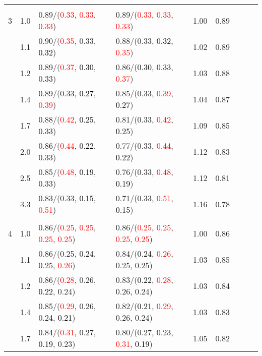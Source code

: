 \documentclass[10pt,a4paper]{report}
\begin{document}
\begin{table}[!htbp]
\begin{center}
{\begin{tabular}{ccllccccc}
			&&&&\\
			3			&1.0&0.89/(\textcolor{red}{0.33}, \textcolor{red}{0.33}, \textcolor{red}{0.33})&0.89/(\textcolor{red}{0.33}, \textcolor{red}{0.33}, \textcolor{red}{0.33})&1.00&0.89\\
			&1.1&0.90/(\textcolor{red}{0.35}, 0.33, \textcolor{black}{0.32})&0.88/(0.33, \textcolor{black}{0.32}, \textcolor{red}{0.35})&1.02&0.89\\
			&1.2&0.89/(\textcolor{red}{0.37}, \textcolor{black}{0.30}, 0.33)&0.86/(\textcolor{black}{0.30}, 0.33, \textcolor{red}{0.37})&1.03&0.88\\
			&1.4&0.89/(0.33, \textcolor{black}{0.27}, \textcolor{red}{0.39})&0.85/(0.33, \textcolor{red}{0.39}, \textcolor{black}{0.27})&1.04&0.87\\
			&1.7&0.88/(\textcolor{red}{0.42}, \textcolor{black}{0.25}, 0.33)&0.81/(0.33, \textcolor{red}{0.42}, \textcolor{black}{0.25})&1.09&0.85\\
			&2.0&0.86/(\textcolor{red}{0.44}, \textcolor{black}{0.22}, 0.33)&0.77/(0.33, \textcolor{red}{0.44}, \textcolor{black}{0.22})&1.12&0.83\\
			&2.5&0.85/(\textcolor{red}{0.48}, \textcolor{black}{0.19}, 0.33)&0.76/(0.33, \textcolor{red}{0.48}, \textcolor{black}{0.19})&1.12&0.81\\
			&3.3&0.83/(0.33, \textcolor{black}{0.15}, \textcolor{red}{0.51})&0.71/(0.33, \textcolor{red}{0.51}, \textcolor{black}{0.15})&1.16&0.78\\
			&&&&\\
			4			&1.0&0.86/(\textcolor{red}{0.25}, \textcolor{red}{0.25}, \textcolor{red}{0.25}, \textcolor{red}{0.25})&0.86/(\textcolor{red}{0.25}, \textcolor{red}{0.25}, \textcolor{red}{0.25}, \textcolor{red}{0.25})&1.00&0.86\\
			&1.1&0.86/(0.25, \textcolor{black}{0.24}, 0.25, \textcolor{red}{0.26})&0.84/(\textcolor{black}{0.24}, \textcolor{red}{0.26}, 0.25, 0.25)&1.03&0.85\\
			&1.2&0.86/(\textcolor{red}{0.28}, 0.26, \textcolor{black}{0.22}, 0.24)&0.83/(\textcolor{black}{0.22}, \textcolor{red}{0.28}, 0.26, 0.24)&1.03&0.84\\
			&1.4&0.85/(\textcolor{red}{0.29}, 0.26, 0.24, \textcolor{black}{0.21})&0.82/(\textcolor{black}{0.21}, \textcolor{red}{0.29}, 0.26, 0.24)&1.03&0.83\\
			&1.7&0.84/(\textcolor{red}{0.31}, 0.27, \textcolor{black}{0.19}, 0.23)&0.80/(0.27, 0.23, \textcolor{red}{0.31}, \textcolor{black}{0.19})&1.05&0.82\\

\end{tabular}}
\end{center}
\end{table}
\end{document}
